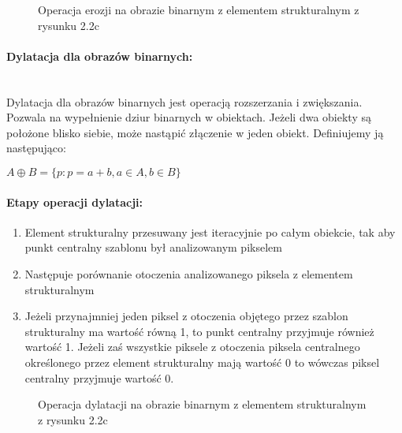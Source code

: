 \documentclass[a4paper,12pt,twoside,openany]{report}
\newcommand{\ImgPath}{.}
\begin{document}
\begin{figure}[H]
	\centering
	\caption{Operacja erozji na obrazie binarnym z elementem strukturalnym z rysunku 2.2c}
\end{figure}

\paragraph{Dylatacja dla obrazów binarnych:}\mbox{} \\
\indent Dylatacja dla obrazów binarnych jest operacją rozszerzania i zwiększania. Pozwala na wypełnienie dziur binarnych w obiektach. Jeżeli dwa obiekty są położone blisko siebie, może nastąpić złączenie w jeden obiekt. Definiujemy ją następująco: 
\begin{center}
	$ A \oplus B = \{p \colon p = a + b, a \in A, b \in B\} $ 
\end{center}

\paragraph{Etapy operacji dylatacji:}
\begin{enumerate}
	\item Element strukturalny przesuwany jest iteracyjnie po całym obiekcie, tak aby punkt centralny szablonu był analizowanym pikselem
	\item Następuje porównanie otoczenia analizowanego piksela z elementem strukturalnym
	\item Jeżeli przynajmniej jeden piksel z otoczenia objętego przez szablon strukturalny ma wartość równą 1, to punkt centralny przyjmuje również wartość 1. Jeżeli zaś wszystkie piksele z otoczenia piksela centralnego określonego przez element strukturalny mają wartość 0 to wówczas piksel centralny przyjmuje wartość 0.
\end{enumerate}

\begin{figure}[H]
	\centering
	\caption{Operacja dylatacji na obrazie binarnym z elementem strukturalnym z rysunku 2.2c}
\end{figure}
\end{document}
